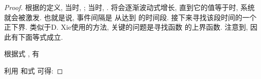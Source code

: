         \begin{proof}
        根据的定义, 当时, ; 当时, .  将会逐渐波动式增长, 直到它的值等于时, 系统就会被激发. 也就是说, 事件间隔是 从达到 的时间段. 接下来寻找该段时间的一个正下界. 类似于D. Xie使用的方法, 关键的问题是寻找函数 的上界函数. 注意到, 因此有下面等式成立.
        \begin{comment}\label{eet1}
        \frac{d\|\hat{{\delta}}(t)\|}{dt}=\frac{\hat{{\delta}}^\top(t)\dot{\hat\delta}(t)}{\|\hat{{\delta}}(t)\|}
        =\frac{\hat{{\delta}}^\top(t)(L_{u}\otimes I_n)\dot{\delta}(t)}{\|\hat{{\delta}}(t)\|}
        =\frac{-\hat{{\delta}}^\top(t)\dot{\hat{x}}(t)}{\|\hat{{\delta}}(t)\|}.
        \end{comment}
        根据式 , 有
         \begin{comment}\label{ex}
        \nonumber\frac{d}{dt}\frac{\|\hat{{\delta}}(t)\|}{\|\hat{x}(t)\|}&=\frac{\|\hat{x}(t)\|}{\|\hat{x}(t)\|^2}\frac{d\|\hat{{\delta}}(t)\|}{dt}-\frac{\|\hat{{\delta}}(t)\|}{\|\hat{x}(t)\|^2}\frac{d\|\hat{x}(t)\|}{dt}\\
        \nonumber&=\frac{-\hat{{\delta}}^\top(t)\dot{\hat{x}}(t)}{\|\hat{{\delta}}(t)\|\|\hat{x}(t)\|}-\frac{\|\hat{{\delta}}(t)\|\hat{x}^\top(t)\dot{\hat{x}}(t)}{\|\hat{x}(t)\|^3}\\
        &\leq\Big(1+\frac{\|\hat{{\delta}}(t)\|}{\|\hat{x}(t)\|}\Big)\frac{\|\dot{\hat{x}}(t)\|}{\|\hat{x}(t)\|}.
        \end{comment}
        利用 和式  可得:
        \begin{comment}\label{eet0}
        \nonumber\|\dot{\hat{x}}(t)\|&=\|(L_{u}\otimes I_n)\dot{x}(t)\|\\
        \nonumber&=\Big\|(L_{u}\otimes I_n)\big[f(t,x(t),x(t-\tau))
        -c(L_{u}\otimes\Gamma)({\delta}(t)+e(t))\\
        \nonumber&\quad-c\rho(B_t\otimes\Gamma)({\delta}(t)+e(t)-(U\otimes I_n){\delta}(t))\big]\Big\|\\
        \nonumber&\leq\|(L_{u}\otimes I_n)f(t,x(t),x(t-\tau))\|+c\|(L(u)\otimes \Gamma)
        (\hat{{\delta}}(t)+\hat{e}(t))\|\\
        \nonumber&\quad+c\rho\|(I_N\otimes\Gamma)(\hat{{\delta}}(t)+\hat{e}(t))\|\\
        &\leq\frac{\bar{\lambda}\alpha_1}{\lambda_2^2}\|\hat{x}(t)\|+\frac{\bar{\lambda}\alpha_2}{\lambda_2^2}\|\hat{x}(t-\tau)\|

\end{comment}
\end{proof}
